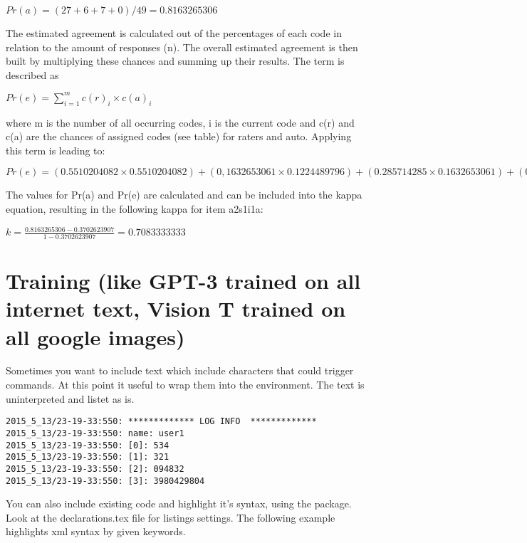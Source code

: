\begin{center}
$Pr(a) = ( 27 + 6 + 7 + 0 ) / 49 = 0.8163265306$
\end{center}

The estimated agreement is calculated out of the percentages of each code in relation to the amount of responses (n). The overall estimated agreement is then built by multiplying these chances and summing up their results. The term is described as

\begin{center}
$Pr(e) = \displaystyle\sum_{i=1}^{m} c(r)_i \times c(a)_i $
\end{center}

where m is the number of all occurring codes, i is the current code and c(r) and c(a) are the chances of assigned codes (see table) for raters and auto. Applying this term is leading to:


\begin{center}
$Pr(e) =  (0.5510204082 \times 0.5510204082) + (0,1632653061 \times 0.1224489796) + (0.285714285 \times 0.1632653061) + (0 \times 0) = 0.3702623907$
\end{center}

The values for Pr(a) and Pr(e) are calculated and can be included into the kappa equation, resulting in the following kappa for item a2s1i1a:

\begin{center}
 $k=\frac{0.8163265306 -0.3702623907}{1 - 0.3702623907} = 0.7083333333$
\end{center}


\section{Training (like GPT-3 trained on all internet text, Vision T trained on all google images)}

Sometimes you want to include text which include characters that could trigger commands. At this point it useful to wrap them into the  environment. The text is uninterpreted and listet as is.

\scriptsize
\begin{verbatim}
2015_5_13/23-19-33:550: ************* LOG INFO  *************
2015_5_13/23-19-33:550: name: user1
2015_5_13/23-19-33:550: [0]: 534
2015_5_13/23-19-33:550: [1]: 321
2015_5_13/23-19-33:550: [2]: 094832
2015_5_13/23-19-33:550: [3]: 3980429804
\end{verbatim}
\normalsize	


You can also include existing code and highlight it's syntax, using the  package. Look at the declarations.tex file for listings settings. The following example highlights xml syntax by given keywords.

